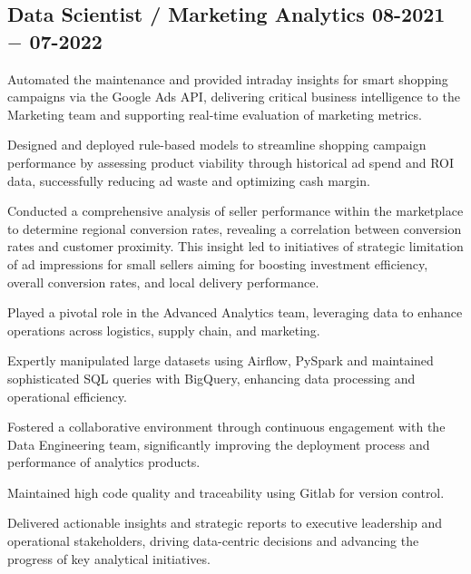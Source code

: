 \subsection{{Data Scientist / Marketing Analytics \hfill 08-2021 $-$ 07-2022}}
\begin{zitemize}
\item Automated the maintenance and provided intraday insights for smart shopping campaigns via the Google Ads API, delivering critical business intelligence to the Marketing team and supporting real-time evaluation of marketing metrics.
\item Designed and deployed rule-based models to streamline shopping campaign performance by assessing product viability through historical ad spend and ROI data, successfully reducing ad waste and optimizing cash margin.
\item Conducted a comprehensive analysis of seller performance within the marketplace to determine regional conversion rates, revealing a correlation between conversion rates and customer proximity. This insight led to initiatives of strategic limitation of ad impressions for small sellers aiming for boosting investment efficiency, overall conversion rates, and local delivery performance.
\item Played a pivotal role in the Advanced Analytics team, leveraging data to enhance operations across logistics, supply chain, and marketing. 
\item Expertly manipulated large datasets using Airflow, PySpark and maintained sophisticated SQL queries with BigQuery, enhancing data processing and operational efficiency.
\item Fostered a collaborative environment through continuous engagement with the Data Engineering team, significantly improving the deployment process and performance of analytics products. 
\item Maintained high code quality and traceability using Gitlab for version control.
\item Delivered actionable insights and strategic reports to executive leadership and operational stakeholders, driving data-centric decisions and advancing the progress of key analytical initiatives.
\end{zitemize}


